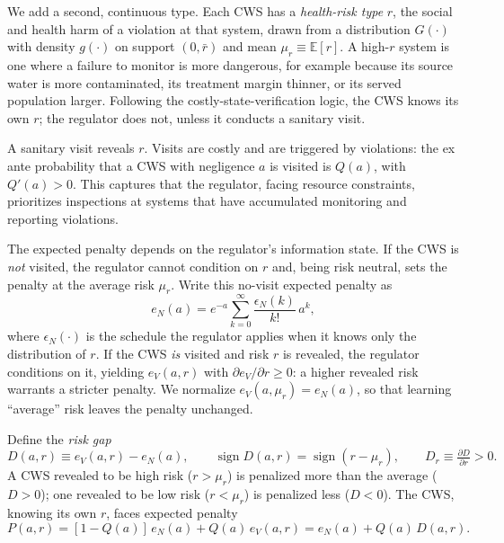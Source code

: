 \documentclass{article}
\begin{document}
We add a second, continuous type. Each CWS has a \emph{health-risk type} $r$, the social and health harm of a violation at that system, drawn from a distribution $G(\cdot)$ with density $g(\cdot)$ on support $(0,\bar{r})$ and mean $\mu_r \equiv \mathbb{E}[r]$. A high-$r$ system is one where a failure to monitor is more dangerous, for example because its source water is more contaminated, its treatment margin thinner, or its served population larger. Following the costly-state-verification logic, the CWS knows its own $r$; the regulator does not, unless it conducts a sanitary visit.

A sanitary visit reveals $r$. Visits are costly and are triggered by violations: the ex ante probability that a CWS with negligence $a$ is visited is $Q(a)$, with $Q'(a)>0$. This captures that the regulator, facing resource constraints, prioritizes inspections at systems that have accumulated monitoring and reporting violations.

The expected penalty depends on the regulator's information state. If the CWS is \emph{not} visited, the regulator cannot condition on $r$ and, being risk neutral, sets the penalty at the average risk $\mu_r$. Write this no-visit expected penalty as
\[
e_N(a) = e^{-a}\sum_{k=0}^{\infty} \frac{\epsilon_N(k)}{k!}\,a^k ,
\]
where $\epsilon_N(\cdot)$ is the schedule the regulator applies when it knows only the distribution of $r$. If the CWS \emph{is} visited and risk $r$ is revealed, the regulator conditions on it, yielding $e_V(a,r)$ with $\partial e_V/\partial r \ge 0$: a higher revealed risk warrants a stricter penalty. We normalize $e_V(a,\mu_r) = e_N(a)$, so that learning ``average'' risk leaves the penalty unchanged.

Define the \emph{risk gap}
\[
D(a,r) \equiv e_V(a,r) - e_N(a), \qquad \operatorname{sign} D(a,r) = \operatorname{sign}(r-\mu_r), \qquad D_r \equiv \tfrac{\partial D}{\partial r} > 0 .
\]
A CWS revealed to be high risk ($r>\mu_r$) is penalized more than the average ($D>0$); one revealed to be low risk ($r<\mu_r$) is penalized less ($D<0$). The CWS, knowing its own $r$, faces expected penalty
\begin{equation}\label{eq:expected_penalty_visit}
P(a,r) = [1-Q(a)]\,e_N(a) + Q(a)\,e_V(a,r) = e_N(a) + Q(a)\,D(a,r).
\end{equation}
\end{document}
